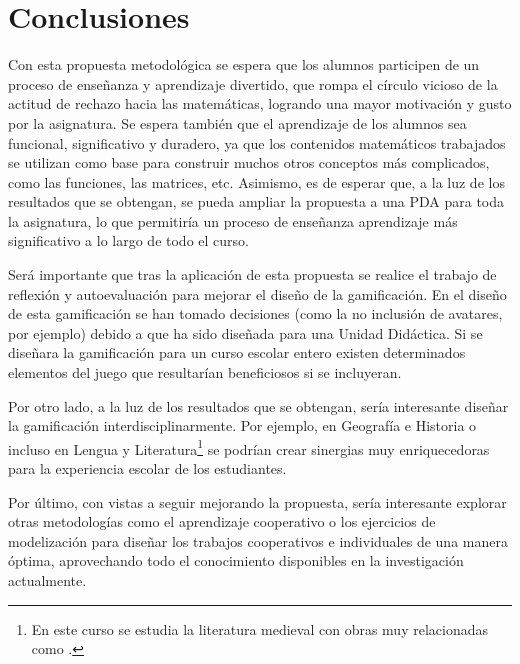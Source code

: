 
\chapter{Conclusiones}
\label{chap:conclusiones}

Con esta propuesta metodológica se espera que los alumnos participen de un proceso de enseñanza y aprendizaje divertido, que rompa el círculo vicioso de la actitud de rechazo hacia las matemáticas, logrando una mayor motivación y gusto por la asignatura.
%
Se espera también que el aprendizaje de los alumnos sea funcional, significativo y duradero, ya que los contenidos matemáticos trabajados se utilizan como base para construir muchos otros conceptos más complicados, como las funciones, las matrices, etc.
Asimismo, es de esperar que, a la luz de los resultados que se obtengan, se pueda ampliar la propuesta a una \gls{PDA} para toda la asignatura, lo que permitiría un proceso de enseñanza aprendizaje más significativo a lo largo de todo el curso.

Será importante que tras la aplicación de esta propuesta se realice el trabajo de reflexión y autoevaluación para mejorar el diseño de la gamificación.
%
En el diseño de esta gamificación se han tomado decisiones (como la no inclusión de avatares, por ejemplo) debido a que ha sido diseñada para una Unidad Didáctica.
%
Si se diseñara la gamificación para un curso escolar entero existen determinados elementos del juego que resultarían beneficiosos si se incluyeran.


Por otro lado, a la luz de los resultados que se obtengan, sería interesante diseñar la gamificación interdisciplinarmente.
%
Por ejemplo, en Geografía e Historia o incluso en Lengua y Literatura\footnote{En este curso se estudia la literatura medieval con obras muy relacionadas como .} se podrían crear sinergias muy enriquecedoras para la experiencia escolar de los estudiantes.

Por último, con vistas a seguir mejorando la propuesta, sería interesante explorar otras metodologías como el aprendizaje cooperativo o los ejercicios de modelización para diseñar los trabajos cooperativos e individuales de una manera óptima, aprovechando todo el conocimiento disponibles en la investigación actualmente.

